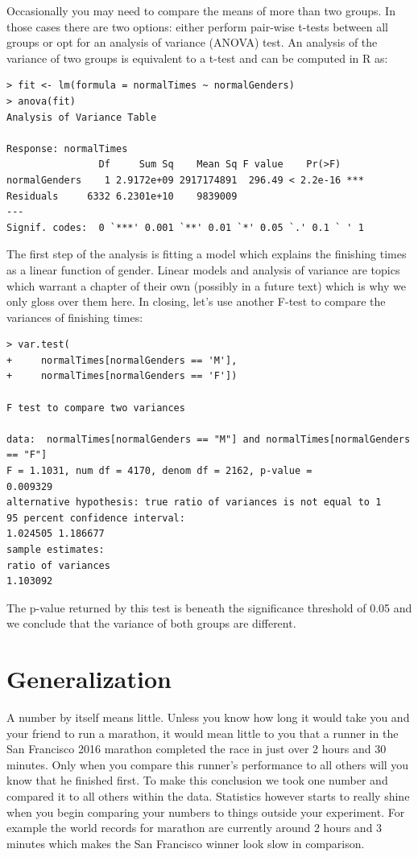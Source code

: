 \documentclass{tufte-book} %
\begin{document}
Occasionally you may need to compare the means of more than two groups. In those cases there are two options: either perform pair-wise t-tests between all groups or opt for an analysis of variance (ANOVA) test. An analysis of the variance of two groups is equivalent to a t-test and can be computed in R as:

\begin{Verbatim}
> fit <- lm(formula = normalTimes ~ normalGenders)
> anova(fit)
Analysis of Variance Table

Response: normalTimes
                Df     Sum Sq    Mean Sq F value    Pr(>F)    
normalGenders    1 2.9172e+09 2917174891  296.49 < 2.2e-16 ***
Residuals     6332 6.2301e+10    9839009                      
---
Signif. codes:  0 `***' 0.001 `**' 0.01 `*' 0.05 `.' 0.1 ` ' 1
\end{Verbatim}

The first step of the analysis is fitting a model which explains the finishing times as a linear function of gender. Linear models and analysis of variance are topics which warrant a chapter of their own (possibly in a future text) which is why we only gloss over them here. In closing, let's use another F-test to compare the variances of finishing times:

\begin{Verbatim}
> var.test(
+     normalTimes[normalGenders == 'M'], 
+     normalTimes[normalGenders == 'F'])

F test to compare two variances

data:  normalTimes[normalGenders == "M"] and normalTimes[normalGenders == "F"]
F = 1.1031, num df = 4170, denom df = 2162, p-value =
0.009329
alternative hypothesis: true ratio of variances is not equal to 1
95 percent confidence interval:
1.024505 1.186677
sample estimates:
ratio of variances 
1.103092 
\end{Verbatim}

The p-value returned by this test is beneath the significance threshold of 0.05 and we conclude that the variance of both groups are different.

\section{Generalization}
A number by itself means little. Unless you know how long it would take you and your friend to run a marathon, it would mean little to you that a runner in the San Francisco 2016 marathon completed the race in just over 2 hours and 30 minutes. Only when you compare this runner's performance to all others will you know that he finished first. To make this conclusion we took one number and compared it to all others within the data. Statistics however starts to really shine when you begin comparing your numbers to things outside your experiment. For example the world records for marathon are currently around 2 hours and 3 minutes which makes the San Francisco winner look slow in comparison.
\end{document}
